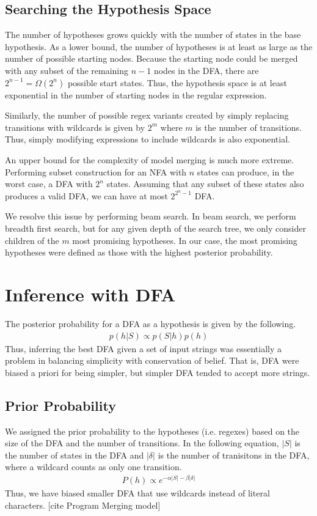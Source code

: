 \documentclass[10pt,letterpaper]{article}
\begin{document}
\subsection{Searching the Hypothesis Space} The number of hypotheses grows quickly with the number of states in the base hypothesis. As a lower bound, the number of hypotheses is at least as large as the number of possible starting nodes. Because the starting node could be merged with any subset of the remaining $n-1$ nodes in the DFA, there are $2^{n-1}=\Omega(2^n)$ possible start states. Thus, the hypothesis space is at least exponential in the number of starting nodes in the regular expression.

Similarly, the number of possible regex variants created by simply replacing transitions with wildcards is given by $2^m$ where $m$ is the number of transitions. Thus, simply modifying expressions to include wildcards is also exponential.

An upper bound for the complexity of model merging is much more extreme. Performing subset construction for an NFA with $n$ states can produce, in the worst case, a DFA with $2^n$ states. Assuming that any subset of these states also produces a valid DFA, we can have at most $2^{2^n-1}$ DFA.

We resolve this issue by performing beam search. In beam search, we perform breadth first search, but for any given depth of the search tree, we only consider children of the $m$ most promising hypotheses. In our case, the most promising hypotheses were defined as those with the highest posterior probability. 

\section{Inference with DFA}
The posterior probability for a DFA as a hypothesis is given by the following.
\begin{align*}
	p(h|S) \propto p(S|h)p(h)
\end{align*}
Thus, inferring the best DFA given a set of input strings was essentially a problem in balancing simplicity with conservation of belief. That is, DFA were biased a priori for being simpler, but simpler DFA tended to accept more strings.

\subsection{Prior Probability}
We assigned the prior probability to the hypotheses (i.e. regexes) based on the size of the DFA and the number of transitions. In the following equation, $|S|$ is the number of states in the DFA and $|\delta|$ is the number of tranisitons in the DFA, where a wildcard counts as only one transition. 
\begin{align*}
	P(h) \propto e^{-\alpha|S| - \beta|\delta|}
\end{align*}
Thus, we have biased smaller DFA that use wildcards instead of literal characters. [cite Program Merging model]
\end{document}
